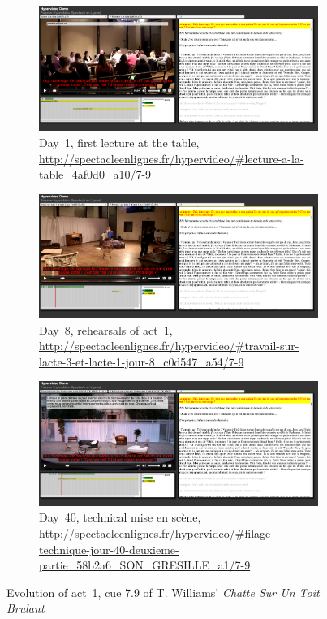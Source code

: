 \documentclass[runningheads,a4paper]{llncs}
\begin{document}
\begin{figure}
        \centering
        \begin{subfigure}[b]{\textwidth}
                \includegraphics[width=\textwidth]{spel1}
                \caption{Day~1, first lecture at the table,
                	\url{http://spectacleenlignes.fr/hypervideo/\#lecture-a-la-table_4af0d0_a10/7-9}}
                \label{fig:day1}
        \end{subfigure}
        
        \begin{subfigure}[b]{\textwidth}
                \includegraphics[width=\textwidth]{spel2}
                \caption{Day~8, rehearsals of act~1,
                	\url{http://spectacleenlignes.fr/hypervideo/\#travail-sur-lacte-3-et-lacte-1-jour-8_c0d547_a54/7-9}}
                \label{fig:day8}
        \end{subfigure}
        
        \begin{subfigure}[b]{\textwidth}
                \includegraphics[width=\textwidth]{spel3}
                \caption{Day~40, technical mise en scène,
                	\url{http://spectacleenlignes.fr/hypervideo/\#filage-technique-jour-40-deuxieme-partie_58b2a6_SON_GRESILLE_a1/7-9}}
                \label{fig:day40}
        \end{subfigure}
        \caption{Evolution of act~1, cue 7.9 of T. Williams' \emph{Chatte Sur Un Toit Brulant}}\label{fig:animals}
\end{figure}
\end{document}
